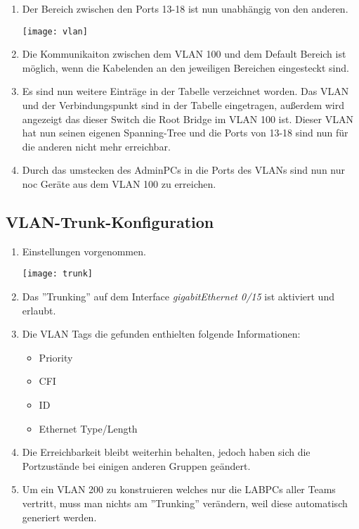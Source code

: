 \documentclass{scrartcl}
\begin{document}
  \renewcommand{\labelenumi}{\alph{enumi})}
  \begin{enumerate}
    \item
    Der Bereich zwischen den Ports 13-18 ist nun unabhängig von den anderen.
    
    \texttt{[image: vlan]}
    \label{fig:vlan}
    
    \item
    Die Kommunikaiton zwischen dem VLAN 100 und dem Default Bereich ist möglich, wenn die Kabelenden an den jeweiligen Bereichen eingesteckt sind.
    
    \item
    Es sind nun weitere Einträge in der Tabelle verzeichnet worden. Das VLAN und der Verbindungspunkt sind in der Tabelle eingetragen, außerdem wird angezeigt das dieser Switch die Root Bridge im VLAN 100 ist. Dieser VLAN hat nun seinen eigenen Spanning-Tree und die Ports von 13-18 sind nun für die anderen nicht mehr erreichbar.
    
    \item
    Durch das umstecken des AdminPCs in die Ports des VLANs sind nun nur noc Geräte aus dem VLAN 100 zu erreichen.
  \end{enumerate}
    
  \subsection[Aufgabe 8 VLAN-Trunk-Konfiguration]{VLAN-Trunk-Konfiguration}
    
  \renewcommand{\labelenumi}{\alph{enumi})}
  \begin{enumerate}
     \item
     Einstellungen vorgenommen.
     
     \texttt{[image: trunk]}
     \label{fig:trunk}
     
     \item
     Das ''Trunking'' auf dem Interface \textit{gigabitEthernet 0/15} ist aktiviert und erlaubt.
     
     \item
     Die VLAN Tags die gefunden enthielten folgende Informationen:
     \begin{itemize}
     \item Priority
     \item CFI
     \item ID
     \item Ethernet Type/Length
     \end{itemize}
    
    \item
    Die Erreichbarkeit bleibt weiterhin behalten, jedoch haben sich die Portzustände bei einigen anderen Gruppen geändert.
    
    \item
    Um ein VLAN 200 zu konstruieren welches nur die LABPCs aller Teams vertritt, muss man nichts am ''Trunking'' verändern, weil diese automatisch generiert werden.
   \end{enumerate}
  
\end{document}
